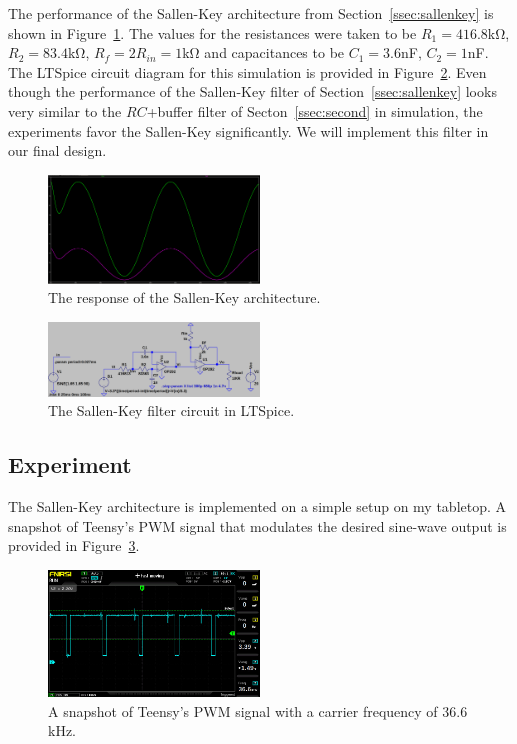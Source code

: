 The performance of the Sallen-Key architecture from Section~\ref{ssec:sallenkey}
is shown in Figure~\ref{fig:sallenkey_response}. The values for the
resistances were taken to be $R_1 = 416.8$\unit{\kilo\ohm}, $R_2 = 83.4$\unit{\kilo\ohm}, $R_f
= 2R_{in} = 1$\unit{\kilo\ohm} and capacitances to be $C_1 =
3.6$\unit{\nano\farad}, $C_2 = 1$\unit{\nano\farad}. The LTSpice circuit diagram
for this simulation is provided in Figure~\ref{fig:sallenkey_circuit}. Even
though the performance of the Sallen-Key filter of Section~\ref{ssec:sallenkey}
looks very similar to the $RC$+buffer filter of Secton~\ref{ssec:second} in
simulation, the experiments favor the Sallen-Key significantly. We will
implement this filter in our final design. 
%
\begin{figure}[tbh]
\includegraphics[width=0.5\textwidth]{./figures/sallenkey_response.png}
\caption{The response of the Sallen-Key architecture.}
\label{fig:sallenkey_response}
\end{figure}
%
\begin{figure}[tbh]
\includegraphics[width=0.5\textwidth]{./figures/sallenkey_circuit.png}
\caption{The Sallen-Key filter circuit in LTSpice.}
\label{fig:sallenkey_circuit}
\end{figure}


\vspace{-1em}
\subsection{Experiment}
\vspace{-1em}

The Sallen-Key architecture is implemented on a simple setup on my tabletop.
A snapshot of Teensy's PWM signal that modulates the desired sine-wave output is
provided in Figure~\ref{fig:teensy_pwm}.


\begin{figure}[bh]
    \includegraphics[width=0.5\textwidth]{./figures/teensy_pwm_osc.jpg}
    \caption{A snapshot of Teensy's PWM signal with a carrier frequency of
    $36.6$\unit{\kilo\hertz}.}
    \label{fig:teensy_pwm}
\end{figure}

